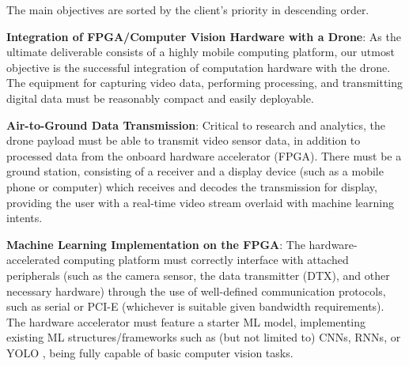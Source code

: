 The main objectives are sorted by the client's priority in descending order.

\textbf{Integration of FPGA/Computer Vision Hardware with a Drone}:
As the ultimate deliverable consists of a highly mobile computing platform,
our utmost objective is the successful integration of computation hardware with the drone.
The equipment for capturing video data, performing processing, and transmitting digital data must be reasonably compact and easily deployable.

\textbf{Air-to-Ground Data Transmission}:
Critical to research and analytics, the drone payload must be able to transmit video sensor data, in addition to processed data
from the onboard hardware accelerator (FPGA). There must be a ground station, consisting of a receiver and a display device (such as a mobile phone or 
computer) which receives and decodes the transmission for display, providing the user with a real-time video stream overlaid with machine learning intents.


\textbf{Machine Learning Implementation on the FPGA}:
The hardware-accelerated computing platform must correctly interface with attached peripherals (such as the camera sensor, the data transmitter (DTX), and other necessary hardware) through the use of well-defined communication protocols, such as serial or PCI-E (whichever is suitable given bandwidth requirements). The hardware accelerator must feature a starter ML model, implementing existing ML structures/frameworks such as (but not limited to) CNNs, RNNs, or YOLO \cite{yolo}, being fully capable of basic computer vision tasks.
